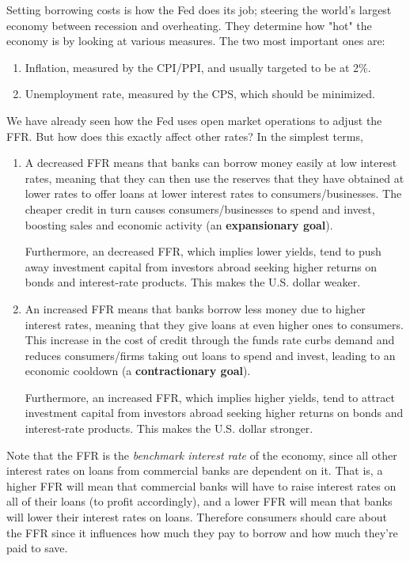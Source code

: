 \documentclass{article}
\begin{document}
      Setting borrowing costs is how the Fed does its job; steering the world's largest economy between recession and overheating. They determine how "hot" the economy is by looking at various measures. The two most important ones are: 
      \begin{enumerate}
        \item Inflation, measured by the CPI/PPI, and usually targeted to be at 2\%. 
        \item Unemployment rate, measured by the CPS, which should be minimized. 
      \end{enumerate}
      We have already seen how the Fed uses open market operations to adjust the FFR. But how does this exactly affect other rates? In the simplest terms, 
      \begin{enumerate}
        \item A decreased FFR means that banks can borrow money easily at low interest rates, meaning that they can then use the reserves that they have obtained at lower rates to offer loans at lower interest rates to consumers/businesses. The cheaper credit in turn causes consumers/businesses to spend and invest, boosting sales and economic activity (an \textbf{expansionary goal}). 
        
        Furthermore, an decreased FFR, which implies lower yields, tend to push away investment capital from investors abroad seeking higher returns on bonds and interest-rate products. This makes the U.S. dollar weaker. 
        
        \item An increased FFR means that banks borrow less money due to higher interest rates, meaning that they give loans at even higher ones to consumers. This increase in the cost of credit through the funds rate curbs demand and reduces consumers/firms taking out loans to spend and invest, leading to an economic cooldown (a \textbf{contractionary goal}). 
        
        Furthermore, an increased FFR, which implies higher yields, tend to attract investment capital from investors abroad seeking higher returns on bonds and interest-rate products. This makes the U.S. dollar stronger. 
      \end{enumerate}

      Note that the FFR is the \textit{benchmark interest rate} of the economy, since all other interest rates on loans from commercial banks are dependent on it. That is, a higher FFR will mean that commercial banks will have to raise interest rates on all of their loans (to profit accordingly), and a lower FFR will mean that banks will lower their interest rates on loans. Therefore consumers should care about the FFR since it influences how much they pay to borrow and how much they're paid to save. 
\end{document}

